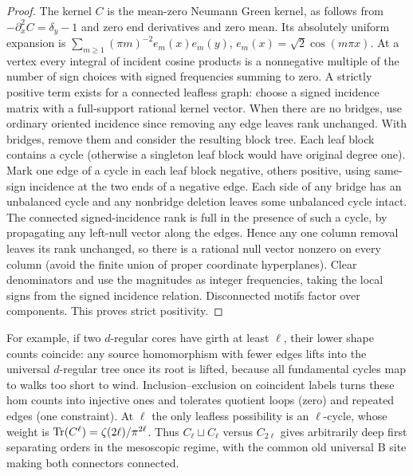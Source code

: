 \begin{proof}
The kernel \(C\) is the mean-zero Neumann Green kernel, as follows from \(-\partial_x^2 C=\delta_y-1\) and zero end derivatives and zero mean. Its absolutely uniform expansion is \(\sum_{m\ge1}(\pi m)^{-2}e_m(x)e_m(y)\), \(e_m(x)=\sqrt2\cos(m\pi x)\). At a vertex every integral of incident cosine products is a nonnegative multiple of the number of sign choices with signed frequencies summing to zero. A strictly positive term exists for a connected leafless graph: choose a signed incidence matrix with a full-support rational kernel vector. When there are no bridges, use ordinary oriented incidence since removing any edge leaves rank unchanged. With bridges, remove them and consider the resulting block tree. Each leaf block contains a cycle (otherwise a singleton leaf block would have original degree one). Mark one edge of a cycle in each leaf block negative, others positive, using same-sign incidence at the two ends of a negative edge. Each side of any bridge has an unbalanced cycle and any nonbridge deletion leaves some unbalanced cycle intact. The connected signed-incidence rank is full in the presence of such a cycle, by propagating any left-null vector along the edges. Hence any one column removal leaves its rank unchanged, so there is a rational null vector nonzero on every column (avoid the finite union of proper coordinate hyperplanes). Clear denominators and use the magnitudes as integer frequencies, taking the local signs from the signed incidence relation. Disconnected motifs factor over components. This proves strict positivity.
\end{proof}

For example, if two \(d\)-regular cores have girth at least \(\ell\), their lower shape counts coincide: any source homomorphism with fewer edges lifts into the universal \(d\)-regular tree once its root is lifted, because all fundamental cycles map to walks too short to wind. Inclusion--exclusion on coincident labels turns these hom counts into injective ones and tolerates quotient loops (zero) and repeated edges (one constraint). At \(\ell\) the only leafless possibility is an \(\ell\)-cycle, whose weight is \(\operatorname{Tr}(C^\ell)=\zeta(2\ell)/\pi^{2\ell}\). Thus \(C_\ell\sqcup C_\ell\) versus \(C_{2\ell}\) gives arbitrarily deep first separating orders in the mesoscopic regime, with the common old universal B site making both connectors connected.

